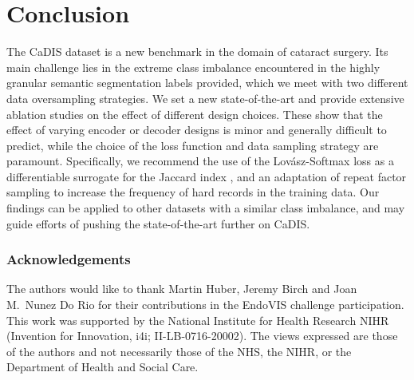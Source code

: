 \documentclass[runningheads]{llncs}
\newcommand{\lov}{Lov\'{a}sz}
\begin{document}
\section{Conclusion}\label{discussion}
The CaDIS dataset is a new benchmark in the domain of cataract surgery. Its main challenge lies in the extreme class imbalance encountered in the highly granular semantic segmentation labels provided, which we meet with two different data oversampling strategies. We set a new state-of-the-art and provide extensive ablation studies on the effect of different design choices. These show that the effect of varying encoder or decoder designs is minor and generally difficult to predict, while the choice of the loss function and data sampling strategy are paramount. Specifically, we recommend the use of the \lov{}-Softmax loss as a differentiable surrogate for the Jaccard index \cite{Lovasz}, and an adaptation of repeat factor sampling \cite{gupta2019lvis} to increase the frequency of hard records in the training data. Our findings can be applied to other datasets with a similar class imbalance, and may guide efforts of pushing the state-of-the-art further on CaDIS.

\subsubsection{Acknowledgements}
The authors would like to thank Martin Huber, Jeremy Birch and Joan M.~Nunez Do Rio for their contributions in the EndoVIS challenge participation. This work was supported by the National Institute for Health Research NIHR (Invention for Innovation, i4i; II-LB-0716-20002). The views expressed are those of the authors and not necessarily those of the NHS, the NIHR, or the Department of Health and Social Care.




\end{document}
